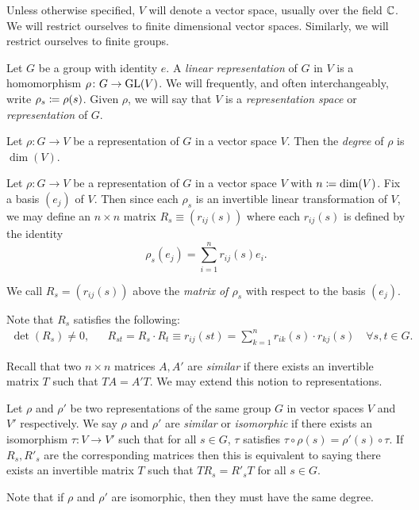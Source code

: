 \documentclass[letterpaper, 11pt, oneside]{book}
\begin{document}
Unless otherwise specified, $V$ will denote a vector space, usually over the field $\mathbb{C}$.
We will restrict ourselves to finite dimensional vector spaces.
Similarly, we will restrict ourselves to finite groups.

\begin{defn}
  Let $G$ be a group with identity $e$.
  A \emph{linear representation} of $G$ in $V$ is a homomorphism $\rho\colon G \to \operatorname{GL}(V)$.
  We will frequently, and often interchangeably, write $\rho_{s} \coloneqq \rho(s)$.
  Given $\rho$, we will say that $V$ is a \emph{representation space} or \emph{representation} of $G$.
\end{defn}

\begin{defn}[Degree]
  Let $\rho\colon G \to V$ be a representation of $G$ in a vector space $V$.
  Then the \emph{degree} of $\rho$ is $\dim(V)$.
\end{defn}

Let $\rho\colon G \to V$ be a representation of $G$ in a vector space $V$ with $n \coloneqq \dim(V)$.
Fix a basis $(e_{j})$ of $V$.
Then since each $\rho_{s}$ is an invertible linear transformation of $V$, we may define an $n \times n$ matrix $R_{s} \equiv (r_{ij}(s))$ where each $r_{ij}(s)$ is defined by the identity
\[
  \rho_{s}(e_{j}) = \sum_{i = 1}^{n} r_{ij}(s) e_{i}.
\]

\begin{defn}
  We call $R_{s} = (r_{ij}(s))$ above the \emph{matrix of $\rho_{s}$} with respect to the basis $(e_{j})$.
\end{defn}
Note that $R_{s}$ satisfies the following:
\begin{align*}
  \det(R_{s}) \neq 0, && R_{st} = R_{s} \cdot R_{t} \equiv r_{ij}(st) = \sum_{k = 1}^{n} r_{ik}(s) \cdot r_{kj}(s) \quad \forall s, t \in G.
\end{align*}

\clearpage

Recall that two $n \times n$ matrices $A, A'$ are \emph{similar} if there exists an invertible matrix $T$ such that $T A = A' T$.
We may extend this notion to representations.
\begin{defn}
  Let $\rho$ and $\rho'$ be two representations of the same group $G$ in vector spaces $V$ and $V'$ respectively.
  We say $\rho$ and $\rho'$ are \emph{similar} or \emph{isomorphic} if there exists an isomorphism $\tau \colon V \to V'$ such that for all $s \in G$, $\tau$ satisfies $\tau \circ \rho(s) = \rho'(s) \circ \tau$.
  If $R_{s}, R'_{s}$ are the corresponding matrices then this is equivalent to saying there exists an invertible matrix $T$ such that $T R_{s} = R'_{s} T$ for all $s \in G$.
\end{defn}
Note that if $\rho$ and $\rho'$ are isomorphic, then they must have the same degree.
\end{document}
